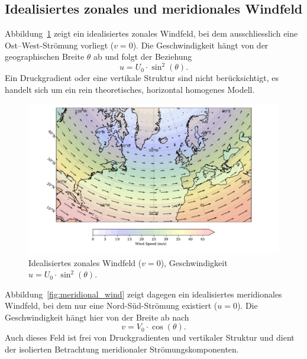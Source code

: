 
\subsection{Idealisiertes zonales und meridionales Windfeld}

Abbildung~\ref{fig:zonal_wind} zeigt ein idealisiertes zonales Windfeld, bei
dem ausschliesslich eine Ost–West-Strömung vorliegt (\(v = 0\)). Die
Geschwindigkeit hängt von der geographischen Breite \(\theta\) ab und folgt der
Beziehung
\begin{equation}
	u = U_0 \cdot \sin^2(\theta).
	\label{rossby:eq:zonal_wind}
\end{equation}
Ein Druckgradient oder eine vertikale Struktur sind nicht berücksichtigt, es handelt sich um ein rein theoretisches, horizontal homogenes Modell.

\begin{figure}
	\centering
	\includegraphics[width=\textwidth, trim=1cm 0cm 2cm 0cm, clip]{papers/rossby/images/zonal_wind_plot.pdf}
	\caption{Idealisiertes zonales Windfeld (\(v=0\)), Geschwindigkeit \(u = U_0 \cdot \sin^2(\theta)\).}
	\label{fig:zonal_wind}
\end{figure}

\noindent
Abbildung~\ref{fig:meridional_wind} zeigt dagegen ein idealisiertes meridionales Windfeld, bei dem nur eine Nord-Süd-Strömung existiert (\(u = 0\)).
Die Geschwindigkeit hängt hier von der Breite ab nach
\begin{equation}
	v = V_0 \cdot \cos(\theta).
	\label{rossby:eq:meridional_wind}
\end{equation}
Auch dieses Feld ist frei von Druckgradienten und vertikaler Struktur und dient der isolierten Betrachtung meridionaler Strömungskomponenten.

